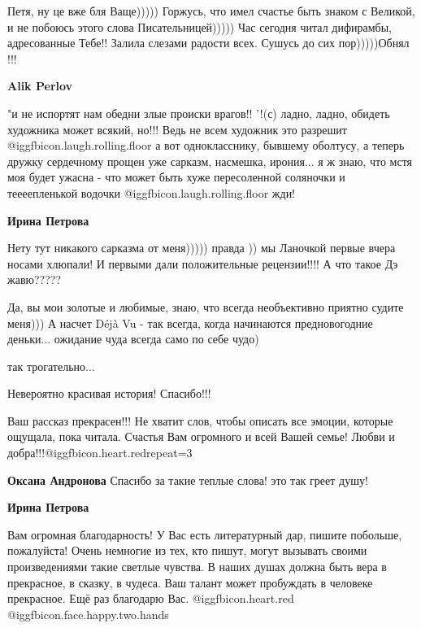 \begin{itemize}
\begin{itemize}
Петя, ну це вже бля Ваще))))) Горжусь, что имел счастье быть знаком с
Великой, и не побоюсь этого слова Писательницей))))) Час сегодня читал
дифирамбы, адресованные Тебе!! Залила слезами радости всех. Сушусь до сих
пор)))))Обнял !!!

\textbf{Alik Perlov} 

"и не испортят нам обедни злые происки врагов!! '!(с) ладно, ладно, обидеть
художника может всякий, но!!! Ведь не всем художник это разрешит @igg{fbicon.laugh.rolling.floor} а вот
однокласснику, бывшему оболтусу, а теперь дружку сердечному прощен уже сарказм,
насмешка, ирония... я ж знаю, что мстя моя будет ужасна - что может быть хуже
пересоленной соляночки и теееепленькой водочки @igg{fbicon.laugh.rolling.floor}  жди!

\textbf{Ирина Петрова} 

Нету тут никакого сарказма от меня))))) правда )) мы Ланочкой первые вчера
носами хлюпали! И первыми дали положительные рецензии!!!! А что такое Дэ
жавю?????


Да, вы мои золотые и любимые, знаю, что всегда необъективно приятно судите
меня))) А насчет Déjà Vu - так всегда, когда начинаются предновогодние
деньки... ожидание чуда всегда само по себе чудо)

\end{itemize} %

так трогательно...

Невероятно красивая история!
Спасибо!!!


Ваш рассказ прекрасен!!! Не хватит слов, чтобы описать все эмоции, которые
ощущала, пока читала. Счастья Вам огромного и всей Вашей семье! Любви и
добра!!!@igg{fbicon.heart.red}{repeat=3}

\begin{itemize} %
\textbf{Оксана Андронова} Спасибо за такие теплые слова! это так греет душу!

\textbf{Ирина Петрова} 

Вам огромная благодарность! У Вас есть литературный дар, пишите побольше,
пожалуйста! Очень немногие из тех, кто пишут, могут вызывать своими
произведениями такие светлые чувства. В наших душах должна быть вера в
прекрасное, в сказку, в чудеса. Ваш талант может пробуждать в человеке
прекрасное. Ещё раз благодарю Вас. @igg{fbicon.heart.red} ️  @igg{fbicon.face.happy.two.hands} 


\end{itemize}
\end{itemize}
